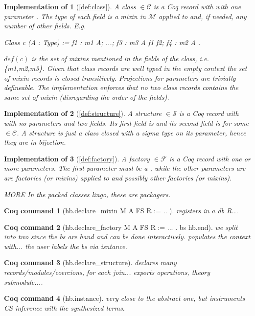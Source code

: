 \documentclass[a4paper,UKenglish,cleveref, autoref]{lipics-v2019}
\newcommand{\mixin}{mixin}
\newcommand{\mixins}{mixins}
\newcommand{\M}{\ensuremath{\mathcal{M}}}
\newcommand{\factory}{factory}
\newcommand{\factories}{factories}
\newcommand{\packager}{packager}
\newcommand{\F}{\ensuremath{\mathcal{F}}}
\newcommand{\C}{\ensuremath{\mathcal{C}}}
\newcommand{\class}{class}
\newcommand{\cdef}{\ensuremath{def}}
\newcommand{\Str}{\ensuremath{\mathcal{S}}}
\newcommand{\structure}{structure}
\theoremstyle{implem}
\newtheorem*{implementation}{Implementation of}
\theoremstyle{implem}
\theoremstyle{axiom}
\theoremstyle{abscommand}
\theoremstyle{command}
\newtheorem*{command}{Coq command}
\begin{document}
\begin{implementation}[\autoref{def:class}]
A \class{}  \(\in \C{}\) is a Coq record with with one parameter
. The type of each field is a \mixin{} in \M{} applied to
 and, if needed, any number of other fields. E.g.
\begin{coqcode}
Class c (A : Type) := { f1 : m1 A; ...; f3 : m3 A f1 f2; f4 : m2 A }.
\end{coqcode}
\(\cdef{}(c)\) is the set of \mixins{} mentioned in the fields of the \class{},
i.e. \{m1,m2,m3\}.
Given that \class{} records are well typed in the empty context
the set of \mixin{} records is closed transitively.
Projections for parameters are trivially defineable.
The implementation enforces that no two
\class{} records contains the same set of
\mixin{} (disregarding the order of the fields).
\end{implementation}

\begin{implementation}[\autoref{def:structure}]
A \structure{}  \(\in \Str{}\) is a Coq record with with no parameters
and two fields. Its first field is  and its second field is
 for some  \(\in \C{}\).
A structure is just a class closed with a sigma type on its parameter, hence
they are in bijection.
\end{implementation}

\begin{implementation}[\autoref{def:factory}]
A \factory{}  \(\in \F{}\) is a Coq record with one or more parameters.
The first parameter must be a , while the other parameters are
are \factories{} (or \mixins) applied to  and possibly other
\factories{} (or \mixins).

MORE
In the packed classes lingo, these are \packager{}s.
\end{implementation}

\begin{command}[hb.declare_mixin M A FS R := { .. } ]
registers in a db R...
\end{command}
\begin{command}[hb.declare_factory M A FS R := {... }. bs hb.end]
we split into two since the bs are hand and can be done interactively.
populates the context with...
the user labels the bs via isntance.
\end{command}
\begin{command}[hb.declare_structure]
declares many records/modules/coercions, for each join... exports operations,
theory submodule....
\end{command}
\begin{command}[hb.instance]
very close to the abstract one, but instruments CS inference with
the synthesized terms.
\end{command}
\end{document}
